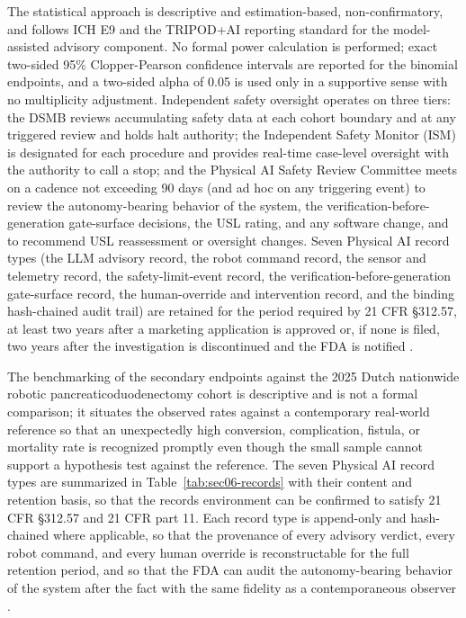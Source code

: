 The statistical approach is descriptive and estimation-based, non-confirmatory, and
follows ICH E9 and the TRIPOD+AI reporting standard for the model-assisted advisory
component. No formal power calculation is performed; exact two-sided 95\%
Clopper-Pearson confidence intervals are reported for the binomial endpoints, and a
two-sided alpha of 0.05 is used only in a supportive sense with no multiplicity
adjustment. Independent safety oversight operates on three tiers: the DSMB reviews
accumulating safety data at each cohort boundary and at any triggered review and
holds halt authority; the Independent Safety Monitor (ISM) is designated for each
procedure and provides real-time case-level oversight with the authority to call a
stop; and the Physical AI Safety Review Committee meets on a cadence not exceeding
90 days (and ad hoc on any triggering event) to review the autonomy-bearing behavior
of the system, the verification-before-generation gate-surface decisions, the USL
rating, and any software change, and to recommend USL reassessment or oversight
changes. Seven Physical AI record types (the LLM advisory record, the robot command
record, the sensor and telemetry record, the safety-limit-event record, the
verification-before-generation gate-surface record, the human-override and
intervention record, and the binding hash-chained audit trail) are retained for the
period required by 21 CFR \S 312.57, at least two years after a marketing
application is approved or, if none is filed, two years after the investigation is
discontinued and the FDA is notified \cite{daraxwhipple,clintrustpai}.

The benchmarking of the secondary endpoints against the 2025 Dutch nationwide
robotic pancreaticoduodenectomy cohort is descriptive and is not a formal comparison;
it situates the observed rates against a contemporary real-world reference so that an
unexpectedly high conversion, complication, fistula, or mortality rate is recognized
promptly even though the small sample cannot support a hypothesis test against the
reference. The seven Physical AI record types are summarized in
Table~\ref{tab:sec06-records} with their content and retention basis, so that the
records environment can be confirmed to satisfy 21 CFR \S 312.57 and 21 CFR part 11.
Each record type is append-only and hash-chained where applicable, so that the
provenance of every advisory verdict, every robot command, and every human override
is reconstructable for the full retention period, and so that the FDA can audit the
autonomy-bearing behavior of the system after the fact with the same fidelity as a
contemporaneous observer \cite{clintrustpai,paisitedocpk}.

